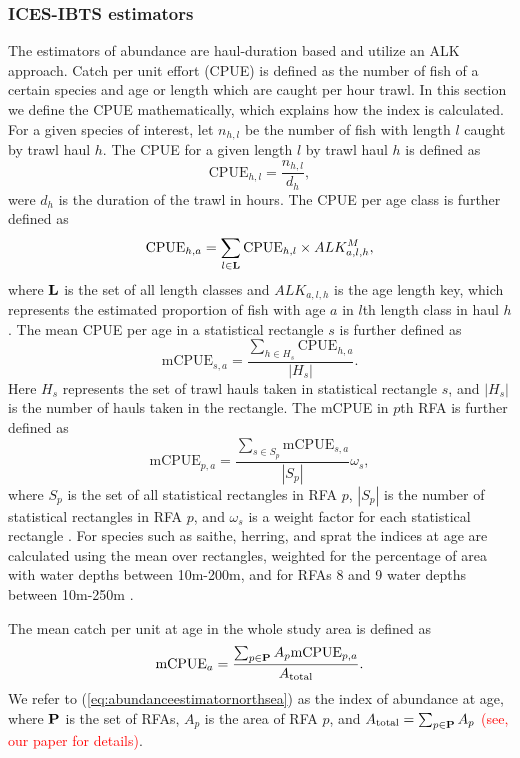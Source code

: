 \documentclass[a4paper 12pt]{article}
\numberwithin{equation}{section}
\newcommand{\ed}[1]{\textcolor{red}{#1}}
\begin{document}
\subsubsection{ICES-IBTS estimators}
\label{sec:ICES-estimator}
The estimators of abundance are haul-duration based and utilize an ALK approach. Catch per unit effort (CPUE) is defined as the number of fish of a certain species and age or length which are caught per hour trawl. In this section we define the CPUE mathematically, which explains how the index is calculated. For a given species of interest, let $n_{h,l}$ be the number of fish with length $l$ caught by trawl haul $h$. The CPUE for a given length $l$ by trawl haul $h$ is defined as 
\begin{equation}\label{eq:cpueHaul}
\mathrm{CPUE}_{h,l} =\frac{n_{h,l}}{d_h},
\end{equation}
were $d_h$ is the duration of the trawl in hours. The CPUE per age class is further defined as
\begin{equation}\label{eq:cpueALK}
\mathrm{CPUE}_{h,a} =\sum_{l \in {\bf L}}\mathrm{CPUE}_{h, l} \times ALK_{a,l,h}^{M},
\end{equation}
where ${\bf L}$ is the set of all length classes and $ALK_{a,l,h}$ is the age length key, which represents the estimated proportion of fish with age $a$ in $l$th length class in haul $h$. The mean CPUE per age in a statistical rectangle $s$ is further defined as
\begin{equation}\label{eq:cpueRec}
\mathrm{mCPUE}_{s,a} =\frac{\sum_{h \in H_{s}} \mathrm{CPUE}_{h,a}}{|H_{s}|}.
\end{equation}
Here $H_{s}$ represents the set of trawl hauls taken in statistical rectangle $s$, and $|H_{s}|$ is the number of hauls taken in the rectangle. The mCPUE in $p$th RFA is further defined as
\begin{equation}\label{eq:cpueRFA}
\mathrm{mCPUE}_{p,a} = \frac{ \sum_{s \in S_{p}} \mathrm{mCPUE}_{s,a}}{|S_{p}|} \omega_s,
\end{equation}
where $S_{p}$ is the set of all statistical rectangles in RFA $p$, $|S_{p}|$ is the number of statistical rectangles in RFA $p$, and $\omega_s$ is a weight factor for each statistical rectangle \citep{ICES2013}. For species such as saithe, herring, and sprat the indices at age are calculated using the mean over rectangles, weighted for the percentage of area with water depths between 10m-200m, and for RFAs 8 and 9 water depths between 10m-250m \citep{ICES2013}.

 The mean catch per unit at age in the whole study area is defined as
\begin{equation}
\text{mCPUE}_a= \frac{\sum_{p\in {\bf P}} A_{p}  \mathrm{mCPUE}_{p,a}}{A_{\text{total}}}.
\label{eq:abundanceestimatornorthsea}
\end{equation}
We refer to (\ref{eq:abundanceestimatornorthsea}) as the index of abundance at age, where ${\bf P}$ is the set of RFAs, $A_p$ is the area of RFA $p$, and $A_{\text{total}} = \sum_{p\in {\bf P}} A_{p}$ \ed{(see, our paper for details)}.
\end{document}
